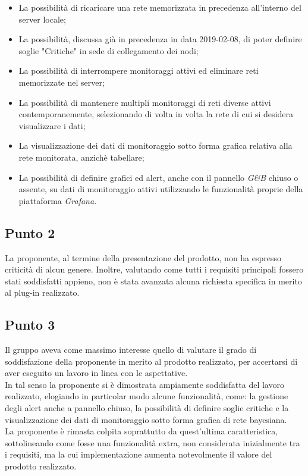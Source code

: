 \begin{itemize}
 \item La possibilità di ricaricare una rete memorizzata in precedenza all'interno del server locale;
 \item La possibilità, discussa già in precedenza in data 2019-02-08, di poter definire soglie "Critiche" in sede di collegamento dei nodi;
 \item La possibilità di interrompere monitoraggi attivi ed eliminare reti memorizzate nel server;
 \item La possibilità di mantenere multipli monitoraggi di reti diverse attivi contemporanemente, selezionando di volta in volta la rete di cui si desidera visualizzare i dati;
 \item La visualizzazione dei dati di monitoraggio sotto forma grafica relativa alla rete monitorata, anzichè tabellare;
 \item La possibilità di definire grafici ed alert, anche con il pannello \textit{G\&B} chiuso o assente, su dati di monitoraggio attivi utilizzando le funzionalità proprie della piattaforma \textit{Grafana}.
\end{itemize}

\subsection{Punto 2}
La proponente, al termine della presentazione del prodotto, non ha espresso criticità di alcun genere. Inoltre, valutando come tutti i requisiti principali fossero stati soddisfatti appieno, non è stata avanzata alcuna richiesta specifica in merito al plug-in realizzato.

\subsection{Punto 3}
Il gruppo aveva come massimo interesse quello di valutare il grado di soddisfazione della proponente in merito al prodotto realizzato, per accertarsi di aver eseguito un lavoro in linea con le aspettative.\\
In tal senso la proponente si è dimostrata ampiamente soddisfatta del lavoro realizzato, elogiando in particolar modo alcune funzionalità, come: la gestione degli alert anche a pannello chiuso, la possibilità di definire soglie critiche e la visualizzazione dei dati di monitoraggio sotto forma grafica di rete bayesiana.\\
La proponente è rimasta colpita soprattutto da quest'ultima caratteristica, sottolineando come fosse una funzionalità extra, non considerata inizialmente tra i requisiti, ma la cui implementazione aumenta notevolmente il valore del prodotto realizzato.

